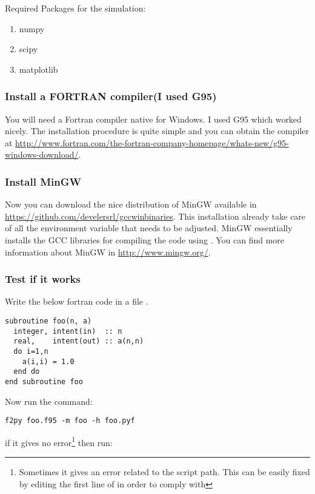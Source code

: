 \documentclass[12pt]{article}
\begin{document}
Required Packages for the simulation:

\begin{enumerate}
\item{numpy}
\item{scipy}
\item{matplotlib}
\end{enumerate}

\subsubsection{Install a FORTRAN compiler(I used G95)}

You will need a Fortran compiler native for Windows. I used G95 which worked nicely. The installation procedure is quite simple and you can obtain the compiler at \url{http://www.fortran.com/the-fortran-company-homepage/whats-new/g95-windows-download/}.

\subsubsection{Install MinGW}

Now you can download the nice distribution of MinGW available in \url{https://github.com/develersrl/gccwinbinaries}. This installation already take care of all the environment variable that needs to be adjusted. MinGW essentially installs the GCC libraries for compiling the code using . You can find more information about MinGW in \url{http://www.mingw.org/}.

\subsubsection{Test if it works}

Write the below fortran code in a file .

\begin{verbatim}
subroutine foo(n, a) 
  integer, intent(in)  :: n  
  real,    intent(out) :: a(n,n)
  do i=1,n
    a(i,i) = 1.0
  end do
end subroutine foo
\end{verbatim}

Now run the command:

\begin{verbatim}
f2py foo.f95 -m foo -h foo.pyf
\end{verbatim}
if it gives no error\footnote{Sometimes it gives an error related to the  script path. This can be easily fixed by editing the first line of  in order to comply with } then run:
\end{document}
